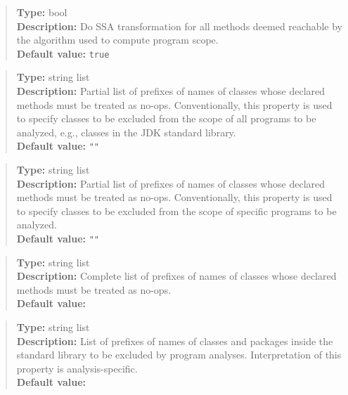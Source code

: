\begin{quote}
{\bf Type:} bool  \\
{\bf Description:} Do SSA transformation for all methods deemed reachable by the algorithm used to compute program scope. \\
{\bf Default value:} {\tt true}
\end{quote}


\begin{quote}
{\bf Type:} string list \\
{\bf Description:} Partial list of prefixes of names of classes whose declared methods must be treated as no-ops.  Conventionally, this property is used to specify classes to be excluded from the scope of all programs to be analyzed, e.g., classes in the JDK standard library. \\
{\bf Default value:} {\tt ""}
\end{quote}

\begin{quote}
{\bf Type:} string list \\
{\bf Description:} Partial list of prefixes of names of classes whose declared methods must be treated as no-ops.  Conventionally, this property is used to specify classes to be excluded from the scope of specific programs to be analyzed. \\
{\bf Default value:} {\tt ""}
\end{quote}

\begin{quote}
{\bf Type:} string list \\
{\bf Description:} Complete list of prefixes of names of classes whose declared methods must be treated as no-ops. \\
{\bf Default value:} 
\end{quote}

\begin{quote}
{\bf Type:} string list \\
{\bf Description:} List of prefixes of names of classes and packages inside the standard library to be excluded by program analyses.  Interpretation of this property is analysis-specific. \\
{\bf Default value:}  
\end{quote}


